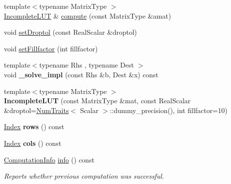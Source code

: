 \begin{DoxyCompactItemize}
\item 
{\footnotesize template$<$typename Matrix\+Type $>$ }\\\hyperlink{group___iterative_linear_solvers___module_class_eigen_1_1_incomplete_l_u_t}{Incomplete\+L\+UT} \& \hyperlink{group___iterative_linear_solvers___module_a488e37ab51d8ed37a297eeca521f1817}{compute} (const Matrix\+Type \&amat)
\item 
void \hyperlink{group___iterative_linear_solvers___module_a9628c5a595e9e984c72d1f8e671a6925}{set\+Droptol} (const Real\+Scalar \&droptol)
\item 
void \hyperlink{group___iterative_linear_solvers___module_a327767d12b55ff8a023f12a030051e17}{set\+Fillfactor} (int fillfactor)
\item 
\mbox{\label{group___iterative_linear_solvers___module_a33ddb6572db03a6dd90982b1c0540322}} 
{\footnotesize template$<$typename Rhs , typename Dest $>$ }\\void {\bfseries \+\_\+solve\+\_\+impl} (const Rhs \&b, Dest \&x) const
\item 
\mbox{\label{group___iterative_linear_solvers___module_a366a154352cb8cc486113238015f9ba2}} 
{\footnotesize template$<$typename Matrix\+Type $>$ }\\{\bfseries Incomplete\+L\+UT} (const Matrix\+Type \&mat, const Real\+Scalar \&droptol=\hyperlink{group___core___module_struct_eigen_1_1_num_traits}{Num\+Traits}$<$ Scalar $>$\+::dummy\+\_\+precision(), int fillfactor=10)
\item 
\mbox{\label{group___iterative_linear_solvers___module_abb76af447c1c8b2baad1241740d300e6}} 
\hyperlink{namespace_eigen_a62e77e0933482dafde8fe197d9a2cfde}{Index} {\bfseries rows} () const
\item 
\mbox{\label{group___iterative_linear_solvers___module_a5b1b721e5fe535c9cacbc3245243f4ec}} 
\hyperlink{namespace_eigen_a62e77e0933482dafde8fe197d9a2cfde}{Index} {\bfseries cols} () const
\item 
\hyperlink{group__enums_ga85fad7b87587764e5cf6b513a9e0ee5e}{Computation\+Info} \hyperlink{group___iterative_linear_solvers___module_a941c7d34f15d7bc287e780636be0ee2b}{info} () const
\begin{DoxyCompactList}\small\item\em Reports whether previous computation was successful. \end{DoxyCompactList}\item 

\end{DoxyCompactItemize}
